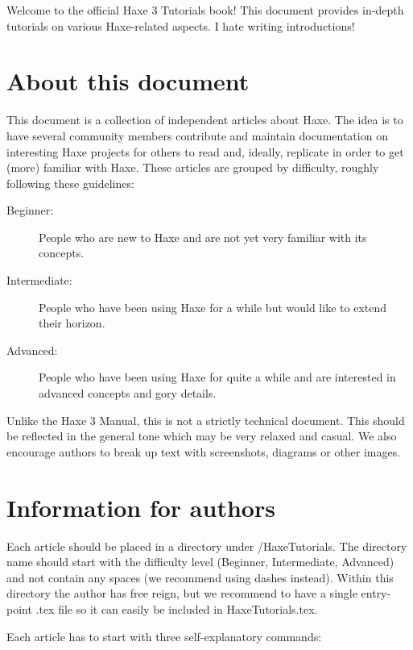 \label{introduction}

Welcome to the official Haxe 3 Tutorials book! This document provides in-depth tutorials on various Haxe-related aspects. I hate writing introductions!

\section*{About this document}
\label{introduction-about-this-document}

This document is a collection of independent articles about Haxe. The idea is to have several community members contribute and maintain documentation on interesting Haxe projects for others to read and, ideally, replicate in order to get (more) familiar with Haxe. These articles are grouped by difficulty, roughly following these guidelines:

\begin{description}
	\item[Beginner:] People who are new to Haxe and are not yet very familiar with its concepts.
	\item[Intermediate:] People who have been using Haxe for a while but would like to extend their horizon.
	\item[Advanced:] People who have been using Haxe for quite a while and are interested in advanced concepts and gory details.
\end{description}

Unlike the Haxe 3 Manual, this is not a strictly technical document. This should be reflected in the general tone which may be very relaxed and casual. We also encourage authors to break up text with screenshots, diagrams or other images.

\section*{Information for authors}
\label{introduction-information-for-authors}

Each article should be placed in a directory under /HaxeTutorials. The directory name should start with the difficulty level (Beginner, Intermediate, Advanced) and not contain any spaces (we recommend using dashes instead). Within this directory the author has free reign, but we recommend to have a single entry-point .tex file so it can easily be included in HaxeTutorials.tex.

Each article has to start with three self-explanatory commands:

